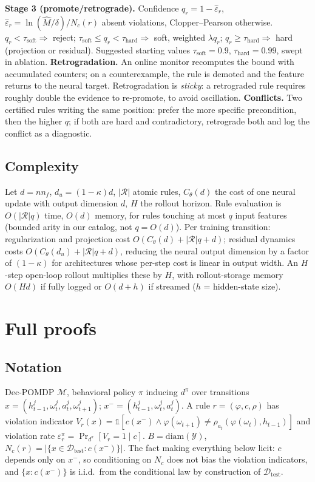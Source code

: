 \documentclass[11pt]{article}
\theoremstyle{plain}
\theoremstyle{definition}
\theoremstyle{remark}
\begin{document}
\begin{algorithm}[H]
\begin{algorithmic}[1]
\STATE \textbf{Stage 3 (promote/retrograde).} Confidence $q_r=1-\hat\varepsilon_r$, $\hat\varepsilon_r=\ln(\hat M/\delta)/N_c(r)$ absent violations, Clopper--Pearson otherwise. $q_r<\tau_{\mathrm{soft}}\Rightarrow$ reject; $\tau_{\mathrm{soft}}\le q_r<\tau_{\mathrm{hard}}\Rightarrow$ soft, weighted $\lambda q_r$; $q_r\ge\tau_{\mathrm{hard}}\Rightarrow$ hard (projection or residual). Suggested starting values $\tau_{\mathrm{soft}}=0.9$, $\tau_{\mathrm{hard}}=0.99$, swept in ablation.
\STATE \textbf{Retrogradation.} An online monitor recomputes the bound with accumulated counters; on a counterexample, the rule is demoted and the feature returns to the neural target. Retrogradation is \emph{sticky}: a retrograded rule requires roughly double the evidence to re-promote, to avoid oscillation.
\STATE \textbf{Conflicts.} Two certified rules writing the same position: prefer the more specific precondition, then the higher $q$; if both are hard and contradictory, retrograde both and log the conflict as a diagnostic.
\end{algorithmic}
\end{algorithm}

\subsection{Complexity}
Let $d=nn_f$, $d_u=(1-\kappa)d$, $|\mathcal{R}|$ atomic rules, $C_\theta(d)$ the cost of one neural update with output dimension $d$, $H$ the rollout horizon. Rule evaluation is $O(|\mathcal{R}|q)$ time, $O(d)$ memory, for rules touching at most $q$ input features (bounded arity in our catalog, not $q=O(d)$). Per training transition: regularization and projection cost $O(C_\theta(d)+|\mathcal{R}|q+d)$; residual dynamics costs $O(C_\theta(d_u)+|\mathcal{R}|q+d)$, reducing the neural output dimension by a factor of $(1-\kappa)$ for architectures whose per-step cost is linear in output width. An $H$-step open-loop rollout multiplies these by $H$, with rollout-storage memory $O(Hd)$ if fully logged or $O(d+h)$ if streamed ($h$ = hidden-state size).

\section{Full proofs}
\label{app:proofs}

\subsection*{Notation}
Dec-POMDP $\mathcal{M}$, behavioral policy $\pi$ inducing $d^\pi$ over transitions $x=(h^j_{t-1},\omega^j_t,a^j_t,\omega^j_{t+1})$; $x^-=(h^j_{t-1},\omega^j_t,a^j_t)$. A rule $r=(\varphi,c,\rho)$ has violation indicator $V_r(x)=\mathbb{1}[c(x^-)\wedge \varphi(\omega_{t+1})\neq\rho_{a_t}(\varphi(\omega_t),h_{t-1})]$ and violation rate $\varepsilon^\pi_r=\Pr_{d^\pi}[V_r=1\mid c]$. $B=\mathrm{diam}(\mathcal{Y})$, $N_c(r)=|\{x\in\mathcal{D}_{\mathrm{test}}: c(x^-)\}|$. The fact making everything below licit: $c$ depends only on $x^-$, so conditioning on $N_c$ does not bias the violation indicators, and $\{x: c(x^-)\}$ is i.i.d.\ from the conditional law by construction of $\mathcal{D}_{\mathrm{test}}$.
\end{document}
